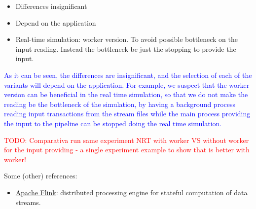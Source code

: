 \documentclass[12pt,a4paper]{article}
\begin{document}
\begin{itemize}
  \item Differences insignificant
  \item Depend on the application
  \item Real-time simulation: worker version. To avoid possible bottleneck on the input reading. Instead the bottleneck be just the stopping to provide the input.
\end{itemize}

\textcolor{blue}{As it can be seen, the differences are insignificant, and the selection of each of the variants will depend on the application. For example, we suspect that the worker version can be beneficial in the real time simulation, so that we do not make the reading be the bottleneck of the simulation, by having a background process reading input transactions from the stream files while the main process providing the input to the pipeline can be stopped doing the real time simulation.}

\textcolor{red}{TODO: Comparativa run same experiment NRT with worker VS without worker for the input providing - a single experiment example to show that is better with worker!}

Some (other) references:

\begin{itemize}
  \item \href{https://www.confluent.io/es-es/learn/apache-flink/}{Apache Flink}: distributed processing engine for stateful computation of data streams.
\end{itemize}
\end{document}
